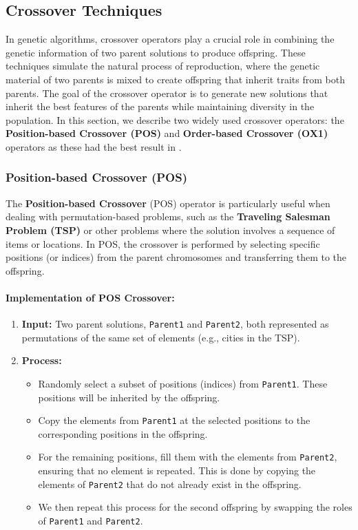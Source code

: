 \documentclass[11pt]{article}
\begin{document}
\subsection{Crossover Techniques}

In genetic algorithms, crossover operators play a crucial role in combining the genetic information of two parent solutions to produce offspring. These techniques simulate the natural process of reproduction, where the genetic material of two parents is mixed to create offspring that inherit traits from both parents. The goal of the crossover operator is to generate new solutions that inherit the best features of the parents while maintaining diversity in the population. In this section, we describe two widely used crossover operators: the \textbf{Position-based Crossover (POS)} and \textbf{Order-based Crossover (OX1)} operators as these had the best result in \cite{Larranaga1999}.

\subsubsection{Position-based Crossover (POS)}

The \textbf{Position-based Crossover} (POS) operator is particularly useful when dealing with permutation-based problems, such as the \textbf{Traveling Salesman Problem (TSP)} or other problems where the solution involves a sequence of items or locations. In POS, the crossover is performed by selecting specific positions (or indices) from the parent chromosomes and transferring them to the offspring.

\paragraph{Implementation of POS Crossover:}

\begin{enumerate}
    \item \textbf{Input:} Two parent solutions, \texttt{Parent1} and \texttt{Parent2}, both represented as permutations of the same set of elements (e.g., cities in the TSP).
    \item \textbf{Process:}
    \begin{itemize}
        \item Randomly select a subset of positions (indices) from \texttt{Parent1}. These positions will be inherited by the offspring.
        \item Copy the elements from \texttt{Parent1} at the selected positions to the corresponding positions in the offspring.
        \item For the remaining positions, fill them with the elements from \texttt{Parent2}, ensuring that no element is repeated. This is done by copying the elements of \texttt{Parent2} that do not already exist in the offspring.
        \item We then repeat this process for the second offspring by swapping the roles of \texttt{Parent1} and \texttt{Parent2}.
    \end{itemize}
\end{enumerate}
\end{document}
